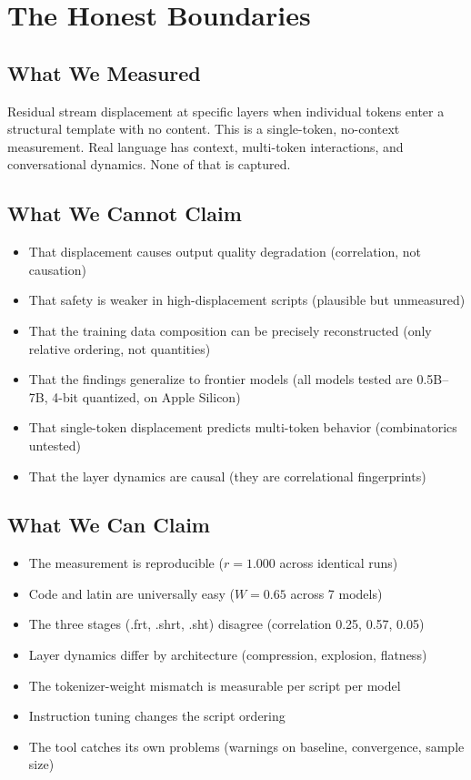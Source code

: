 \documentclass[11pt,a4paper]{article}
\begin{document}
\section{The Honest Boundaries}

\subsection{What We Measured}

Residual stream displacement at specific layers when individual tokens enter a structural template with no content. This is a single-token, no-context measurement. Real language has context, multi-token interactions, and conversational dynamics. None of that is captured.

\subsection{What We Cannot Claim}

\begin{itemize}[nosep]
\item That displacement causes output quality degradation (correlation, not causation)
\item That safety is weaker in high-displacement scripts (plausible but unmeasured)
\item That the training data composition can be precisely reconstructed (only relative ordering, not quantities)
\item That the findings generalize to frontier models (all models tested are 0.5B--7B, 4-bit quantized, on Apple Silicon)
\item That single-token displacement predicts multi-token behavior (combinatorics untested)
\item That the layer dynamics are causal (they are correlational fingerprints)
\end{itemize}

\subsection{What We Can Claim}

\begin{itemize}[nosep]
\item The measurement is reproducible ($r = 1.000$ across identical runs)
\item Code and latin are universally easy ($W = 0.65$ across 7 models)
\item The three stages (.frt, .shrt, .sht) disagree (correlation 0.25, 0.57, 0.05)
\item Layer dynamics differ by architecture (compression, explosion, flatness)
\item The tokenizer-weight mismatch is measurable per script per model
\item Instruction tuning changes the script ordering
\item The tool catches its own problems (warnings on baseline, convergence, sample size)
\end{itemize}
\end{document}
